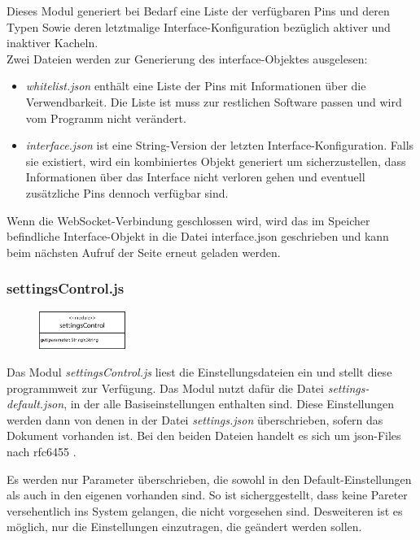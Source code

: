 Dieses Modul generiert bei Bedarf eine Liste der verfügbaren Pins und deren Typen Sowie deren letztmalige Interface-Konfiguration bezüglich aktiver und inaktiver Kacheln.\\

\noindent Zwei Dateien werden zur Generierung des interface-Objektes ausgelesen:

\begin{itemize}
  \item \textit{whitelist.json} enthält eine Liste der Pins mit Informationen über die Verwendbarkeit. Die Liste ist muss zur restlichen Software passen und wird vom Programm nicht verändert.
  \item \textit{interface.json} ist eine String-Version der letzten Interface-Konfiguration. Falls sie existiert, wird ein kombiniertes Objekt generiert um sicherzustellen, dass Informationen über das Interface nicht verloren gehen und eventuell zusätzliche Pins dennoch verfügbar sind.
\end{itemize}

Wenn die WebSocket-Verbindung geschlossen wird, wird das im Speicher befindliche Interface-Objekt in die Datei interface.json geschrieben und kann beim nächsten Aufruf der Seite erneut geladen werden.

\subsubsection{settingsControl.js}
\begin{figure}
  \vspace{-16pt}
  \centering
  \includegraphics[width = 0.25\textwidth]{dokumentation/images/apiSettingsControl.eps}
\end{figure}

Das Modul \textit{settingsControl.js} liest die Einstellungsdateien ein und stellt diese programmweit zur Verfügung. Das Modul nutzt dafür die Datei \textit{settings-default.json}, in der alle Basiseinstellungen enthalten sind. Diese Einstellungen werden dann von denen in der Datei \textit{settings.json} überschrieben, sofern das Dokument vorhanden ist. Bei den beiden Dateien handelt es sich um \gls{json}-Files nach rfc6455 \cite{rfc6455}.

Es werden nur Parameter überschrieben, die sowohl in den Default-Einstellungen als auch in den eigenen vorhanden sind. So ist sicherggestellt, dass keine Pareter versehentlich ins System gelangen, die nicht vorgesehen sind. Desweiteren ist es möglich, nur die Einstellungen einzutragen, die geändert werden sollen.

